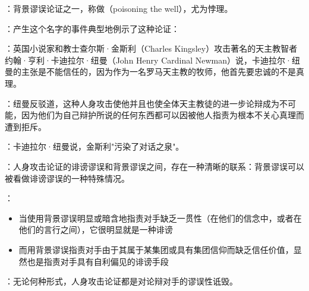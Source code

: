\begin{examplebox}[title=污泉谬误的经典案例]
：背景谬误论证之一，称做（poisoning the well），尤为悖理。

：产生这个名字的事件典型地例示了这种论证：

：英国小说家和教士查尔斯·金斯利（Charles Kingsley）攻击著名的天主教智者约翰·亨利·卡迪拉尔·纽曼（John Henry Cardinal Newman）说，卡迪拉尔·纽曼的主张是不能信任的，因为作为一名罗马天主教的牧师，他首先要忠诚的不是真理。

：纽曼反驳道，这种人身攻击使他并且也使全体天主教徒的进一步论辩成为不可能，因为他们为自己辩护所说的任何东西都可以因被他人指责为根本不关心真理而遭到拒斥。

：卡迪拉尔·纽曼说，金斯利"污染了对话之泉"。
\end{examplebox}

\begin{theorembox}[title=人身攻击论证的内在联系]
：人身攻击论证的诽谤谬误和背景谬误之间，存在一种清晰的联系：背景谬误可以被看做诽谤谬误的一种特殊情况。

：
\begin{itemize}
  \item 当使用背景谬误明显或暗含地指责对手缺乏一贯性（在他们的信念中，或者在他们的言行之间），它很明显就是一种诽谤
  \item 而用背景谬误指责对手由于其属于某集团或具有集团信仰而缺乏信任价值，显然也是指责对手具有自利偏见的诽谤手段
\end{itemize}

：无论何种形式，人身攻击论证都是对论辩对手的谬误性诋毁。
\end{theorembox}